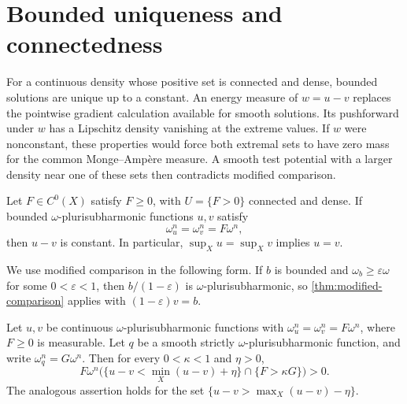 \section{Bounded uniqueness and connectedness}
\label{sec:bounded-connected-uniqueness}

For a continuous density whose positive set is connected and dense, bounded solutions are unique up to a constant. An energy measure of $w=u-v$ replaces the pointwise gradient calculation available for smooth solutions. Its pushforward under $w$ has a Lipschitz density vanishing at the extreme values. If $w$ were nonconstant, these properties would force both extremal sets to have zero mass for the common Monge--Amp\`ere measure. A smooth test potential with a larger density near one of these sets then contradicts modified comparison.

\begin{theorem}\label{thm:connected-positive-uniqueness}
Let $F\in C^0(X)$ satisfy $F\geq0$, with $U=\{F>0\}$ connected and dense. If bounded $\omega$-plurisubharmonic functions $u,v$ satisfy
\[
\omega_u^n=\omega_v^n=F\omega^n,
\]
then $u-v$ is constant. In particular, $\sup_Xu=\sup_Xv$ implies $u=v$.
\end{theorem}

We use modified comparison in the following form. If $b$ is bounded and $\omega_b\geq\varepsilon\omega$ for some $0<\varepsilon<1$, then $b/(1-\varepsilon)$ is $\omega$-plurisubharmonic, so \cref{thm:modified-comparison} applies with $(1-\varepsilon)v=b$.

\begin{proposition}\label{prop:weak-extremum-localization}
Let $u,v$ be continuous $\omega$-plurisubharmonic functions with $\omega_u^n=\omega_v^n=F\omega^n$, where $F\geq0$ is measurable. Let $q$ be a smooth strictly $\omega$-plurisubharmonic function, and write $\omega_q^n=G\omega^n$. Then for every $0<\kappa<1$ and $\eta>0$,
\begin{equation}\label{eq:weak-localization-min}
F\omega^n\bigl(\{u-v<\min_X(u-v)+\eta\}\cap\{F>\kappa G\}\bigr)>0.
\end{equation}
The analogous assertion holds for the set $\{u-v>\max_X(u-v)-\eta\}$.
\end{proposition}

